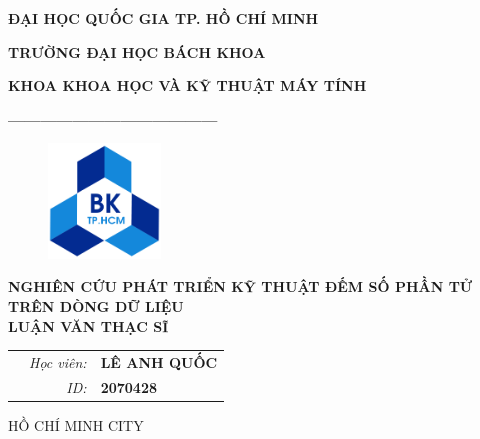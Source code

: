 \documentclass[letterpaper,13pt]{article}
\theoremstyle{mytheor}
\begin{document}
\begin{titlepage}
\begin{center} {\textbf{ĐẠI HỌC QUỐC GIA TP. HỒ CHÍ MINH}
}

{\textbf{TRƯỜNG ĐẠI HỌC BÁCH KHOA}
}

{\textbf{KHOA KHOA HỌC VÀ KỸ THUẬT MÁY TÍNH }
}

{\textbf{---------------------------------------}}

\end{center}

\vspace{1cm}

\begin{figure}[h!]
\begin{center}
\includegraphics[width=3cm]{hcmut.png}
\end{center}
\end{figure}

\vspace{2cm}


\begin{center}
\textbf{\Large NGHIÊN CỨU PHÁT TRIỂN KỸ THUẬT ĐẾM SỐ PHẦN TỬ \\TRÊN DÒNG DỮ LIỆU}
\vspace{1.5cm}
\\
\textbf{\Large LUẬN VĂN THẠC SĨ}
\end{center}

\vspace{3cm}

\begin{table}[h]
\begin{tabular}{rrl}
\hspace{5.1cm} 
&\textit{Học viên: } & \textbf{LÊ ANH QUỐC}\\
&\textit{ID: } & \textbf{2070428}\\

\end{tabular}
\end{table}
\vspace{3cm}
\begin{center}
{\footnotesize HỒ CHÍ MINH CITY}
\end{center}
\end{titlepage}
\end{document}
